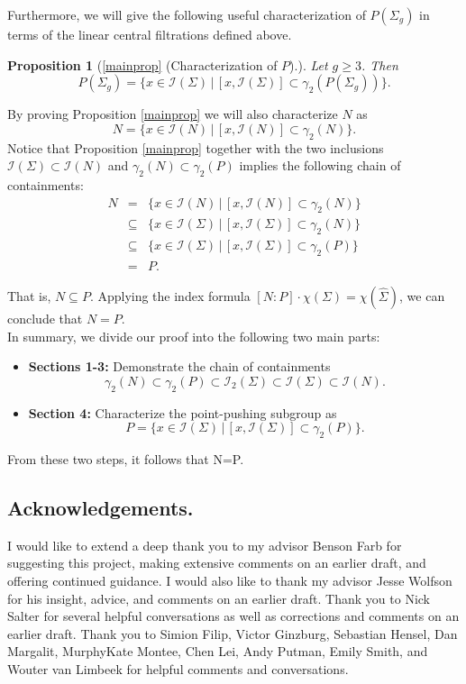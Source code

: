 \documentclass[a4paper]{amsproc}
\theoremstyle{TheoremNum}
\newtheorem{propn}{Proposition}
\theoremstyle{Theorembold}
\theoremstyle{TheoremboldDef}
\theoremstyle{TheoremboldRem}
\theoremstyle{TheoremboldRem}
\begin{document}
  Furthermore, we will give the following useful characterization of $P({\Sigma_{g}})$ in terms of the linear central filtrations defined above.
 \begin{propn}[\ref{mainprop} (Characterization of $P$).]\label{charofP}
 Let $g{\geqslant} 3$. Then \[P({\Sigma_{g}})=\{x\in{{\mathcal{I}}(\Sigma)} \, |\, [x,{{\mathcal{I}}(\Sigma)}]\subset\gamma_2(P({\Sigma_{g}}))\}.\]
  \end{propn}
  By proving Proposition \ref{mainprop} we will also characterize $N$ as \[N=\{x\in{{\mathcal{I}}(N)}\, |\,[x,{{\mathcal{I}}(N)}]\subset\gamma_2(N)\}.\] 
   Notice that Proposition \ref{mainprop} together with the two inclusions ${{\mathcal{I}}(\Sigma)}\subset{{\mathcal{I}}(N)}$ and $\gamma_2(N)\subset\gamma_2(P)$ implies the following chain of containments:
 \begin{eqnarray*}
 N&=&\{x\in{{\mathcal{I}}(N)} \, |\, [x,{{\mathcal{I}}(N)}]\subset\gamma_2(N)\}\\
 & \subseteq & \{x\in{{\mathcal{I}}(\Sigma)} \, |\, [x,{{\mathcal{I}}(\Sigma)}]\subset\gamma_2(N)\}\\
 & \subseteq & \{x\in{{\mathcal{I}}(\Sigma)} \, |\, [x,{{\mathcal{I}}(\Sigma)}]\subset\gamma_2(P)\}\\
 & = & P.
 \end{eqnarray*}
 
 That is, $N\subseteq P$. Applying the index formula $[N:P]\cdot \chi(\Sigma)=\chi(\hat{\Sigma})$, we can conclude that $N=P$.\\
 
In summary, we divide our proof into the following two main parts:
 \begin{itemize}
 \item \textbf{Sections 1-3:} Demonstrate the chain of containments  \[ \gamma_2(N)\subset\gamma_2(P)\subset{{\mathcal{I}}_2(\Sigma)}\subset{{\mathcal{I}}(\Sigma)}\subset{{\mathcal{I}}(N)}.\] 
 \item  \textbf{Section 4:} Characterize the point-pushing subgroup as \[P=\{x\in{{\mathcal{I}}(\Sigma)} \, |\, [x,{{\mathcal{I}}(\Sigma)}]\subset\gamma_2(P)\}.\]
 \end{itemize} From these two steps, it follows that N=P.
  

\subsection{Acknowledgements.} I would like to extend a deep thank you to my advisor Benson Farb for suggesting this project, making extensive comments on an earlier draft, and offering continued guidance. I would also like to thank my advisor Jesse Wolfson for his  insight, advice, and comments on an earlier draft. Thank you to Nick Salter for several helpful conversations as well as corrections and comments on an earlier draft. Thank you to Simion Filip, Victor Ginzburg, Sebastian Hensel,  Dan Margalit,  MurphyKate Montee, Chen Lei, Andy Putman, Emily Smith, and  Wouter van Limbeek for helpful comments and conversations.\\
\end{document}

